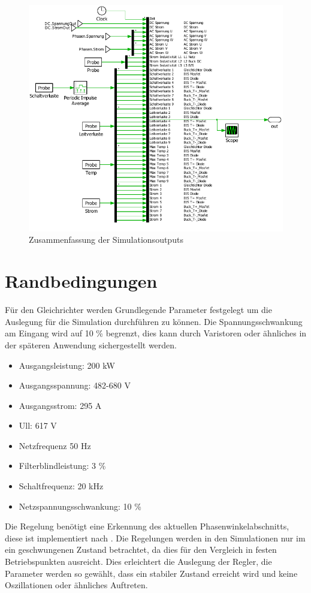 \begin{figure}
\centering
\includegraphics[width=0.9\linewidth]{content/Grafiken/Plecs_Out}
\caption[Zusammenfassung der Simulationsoutputs]{Zusammenfassung der Simulationsoutputs}
\label{fig:plecsout}
\end{figure}


\section{Randbedingungen}
Für den Gleichrichter werden Grundlegende Parameter festgelegt um die Auslegung für die Simulation durchführen zu können. Die Spannungsschwankung am Eingang wird auf 10 \% begrenzt, dies kann durch Varistoren oder ähnliches in der späteren Anwendung sichergestellt werden.

\begin{itemize}
\item Ausgangsleistung: 200 kW
\item Ausgangsspannung: 482-680 V
\item Ausgangsstrom: 	295 A
\item \gls{Ull}:		617 V
\item Netzfrequenz		50 Hz
\item Filterblindleistung: 3 \%
\item Schaltfrequenz: 20 kHz
\item Netzspannungsschwankung: 10 \%
\end{itemize}

Die Regelung benötigt eine Erkennung des aktuellen Phasenwinkelabschnitts, diese ist implementiert nach \cite{InstituteofElectricalandElectronicsEngineers}.
Die Regelungen werden in den Simulationen nur im ein geschwungenen Zustand betrachtet, da dies für den Vergleich in festen Betriebspunkten ausreicht. Dies erleichtert die Auslegung der Regler, die Parameter werden so gewählt, dass ein stabiler Zustand erreicht wird und keine Oszillationen oder ähnliches Auftreten. 


